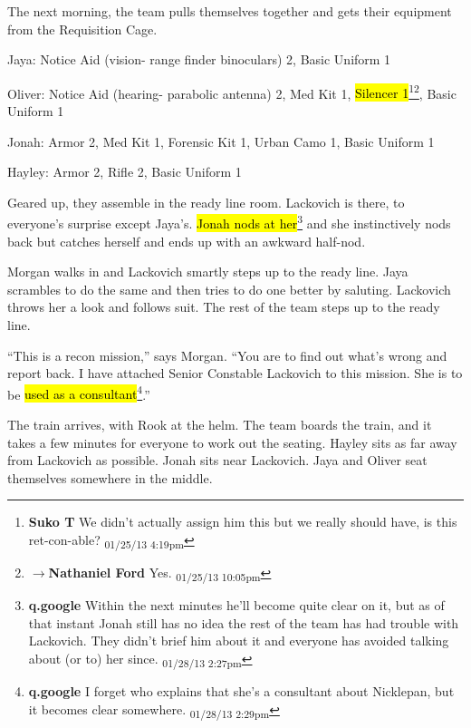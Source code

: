 The next morning, the team pulls themselves together and gets their equipment from the Requisition Cage.



Jaya: Notice Aid (vision- range finder binoculars) 2, Basic Uniform 1

Oliver: Notice Aid (hearing- parabolic antenna) 2, Med Kit 1, \hl{Silencer 1}\footnote{\textbf{Suko T }We didn't actually assign him this but we really should have, is this ret-con-able? \textsubscript{01/25/13 4:19pm}}\footnote{$\rightarrow$\textbf{Nathaniel Ford }Yes. \textsubscript{01/25/13 10:05pm}}, Basic Uniform 1

Jonah:  Armor 2, Med Kit 1, Forensic Kit 1, Urban Camo 1, Basic Uniform 1

Hayley: Armor 2, Rifle 2, Basic Uniform 1



Geared up, they assemble in the ready line room.  Lackovich is there, to everyone's surprise except Jaya's. \hl{Jonah nods at her}\footnote{\textbf{q.google }Within the next minutes he'll become quite clear on it, but as of that instant Jonah still has no idea the rest of the team has had trouble with Lackovich.  They didn't brief him about it and everyone has avoided talking about (or to) her since. \textsubscript{01/28/13 2:27pm}} and she instinctively nods back but catches herself and ends up with an awkward half-nod.



Morgan walks in and Lackovich smartly steps up to the ready line.  Jaya scrambles to do the same and then tries to do one better by saluting.  Lackovich throws her a look and follows suit.  The rest of the team steps up to the ready line.



``This is a recon mission,'' says Morgan.  ``You are to find out what's wrong and report back.  I have attached Senior Constable Lackovich to this mission.  She is to be \hl{used as a consultant}\footnote{\textbf{q.google }I forget who explains that she's a consultant about Nicklepan, but it becomes clear somewhere. \textsubscript{01/28/13 2:29pm}}.''



The train arrives, with Rook at the helm.  The team boards the train, and it takes a few minutes for everyone to work out the seating.  Hayley sits as far away from Lackovich as possible.  Jonah sits near Lackovich.  Jaya and Oliver seat themselves somewhere in the middle.



